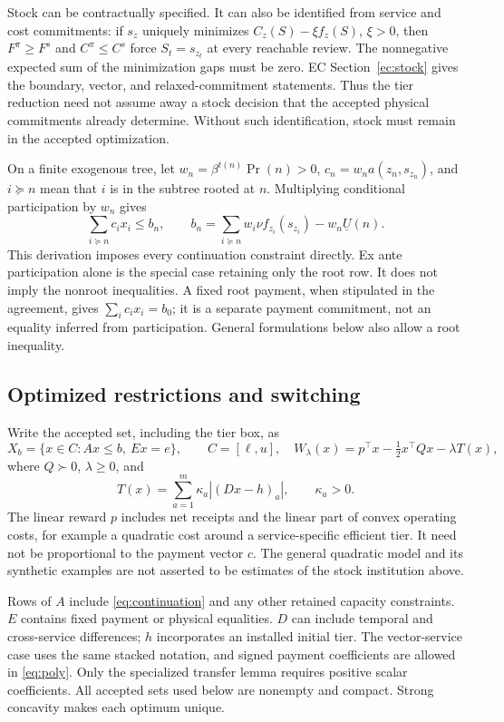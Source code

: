 \documentclass[11pt,letterpaper]{article}
\theoremstyle{definition}\newtheorem{assumption}[theorem]{Assumption}
\begin{document}
Stock can be contractually specified. It can also be identified from service and cost commitments: if $s_z$ uniquely minimizes $C_z(S)-\xi f_z(S)$, $\xi>0$, then $F^\pi\geq F^s$ and $C^\pi\leq C^s$ force $S_t=s_{z_t}$ at every reachable review. The nonnegative expected sum of the minimization gaps must be zero. EC Section~\ref{ec:stock} gives the boundary, vector, and relaxed-commitment statements. Thus the tier reduction need not assume away a stock decision that the accepted physical commitments already determine. Without such identification, stock must remain in the accepted optimization.

On a finite exogenous tree, let $w_n=\beta^{t(n)}\Pr(n)>0$, $c_n=w_na(z_n,s_{z_n})$, and $i\succeq n$ mean that $i$ is in the subtree rooted at $n$. Multiplying conditional participation by $w_n$ gives
\begin{equation}\label{eq:continuation}
 \sum_{i\succeq n}c_i x_i\leq b_n,\qquad
 b_n=\sum_{i\succeq n}w_i\nu f_{z_i}(s_{z_i})-w_n\underline U(n).
\end{equation}
This derivation imposes every continuation constraint directly. Ex ante participation alone is the special case retaining only the root row. It does not imply the nonroot inequalities. A fixed root payment, when stipulated in the agreement, gives $\sum_i c_i x_i=b_0$; it is a separate payment commitment, not an equality inferred from participation. General formulations below also allow a root inequality.

\subsection{Optimized restrictions and switching}
Write the accepted set, including the tier box, as
\begin{equation}\label{eq:poly}
 X_b=\{x\in C:Ax\leq b,\ Ex=e\},\qquad C=[\ell,u],
 \quad W_\lambda(x)=p^\top x-\tfrac12x^\top Qx-\lambda T(x),
\end{equation}
where $Q\succ0$, $\lambda\geq0$, and
\[
 T(x)=\sum_{a=1}^m\kappa_a|(Dx-h)_a|,\qquad \kappa_a>0.
\]
The linear reward $p$ includes net receipts and the linear part of convex operating costs, for example a quadratic cost around a service-specific efficient tier. It need not be proportional to the payment vector $c$. The general quadratic model and its synthetic examples are not asserted to be estimates of the stock institution above.

Rows of $A$ include \eqref{eq:continuation} and any other retained capacity constraints. $E$ contains fixed payment or physical equalities. $D$ can include temporal and cross-service differences; $h$ incorporates an installed initial tier. The vector-service case uses the same stacked notation, and signed payment coefficients are allowed in \eqref{eq:poly}. Only the specialized transfer lemma requires positive scalar coefficients. All accepted sets used below are nonempty and compact. Strong concavity makes each optimum unique.
\end{document}
